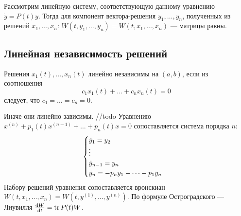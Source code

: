 \documentclass[a4paper]{report}
\begin{document}
    Рассмотрим линейную систему, соответствующую данному уравнению $\dot{y} = P(t)y$.
    Тогда для компонент вектора-решения $y_1, \dots, y_n$, полученных из решений $x_1, \dots, x_n$: $W(t, y_1, \dots, y_n) = W(t, x_1, \dots, x_n)$ --- матрицы равны.

    \subsection{Линейная независимость решений}
    Решения $x_1(t), \dots, x_n(t)$ линейно независимы на $(a, b)$, если из соотношения
    \[c_1 x_1(t) + \dots + c_n x_n(t) = 0\]
    следует, что $c_1 = \dots = c_n = 0$.

    Иначе они линейно зависимы.
    //todo
    Уравнению $x^{(n)} + p_1(t)x^{(n - 1)} + \dots + p_n(t)x = 0$ сопоставляется система порядка $n$:
    \[\begin{cases}\dot{y}_1 = y_2 \\\vdots \\ \dot{y}_{n-1} = y_n \\\dot{y}_n = -p_n y_1 - \dots - p_1 y_n\end{cases}\]
    Набору решений уравнения сопоставляется вронскиан $W(t, x_1, \dots, x_n) = W(t, y^{(1)}, \dots, y^{(n)})$.
    По формуле Остроградского --- Лиувилля $\frac{\operatorname{d}\! W}{\operatorname{d}\! t} = \operatorname{tr} P(t) W$.
\end{document}
